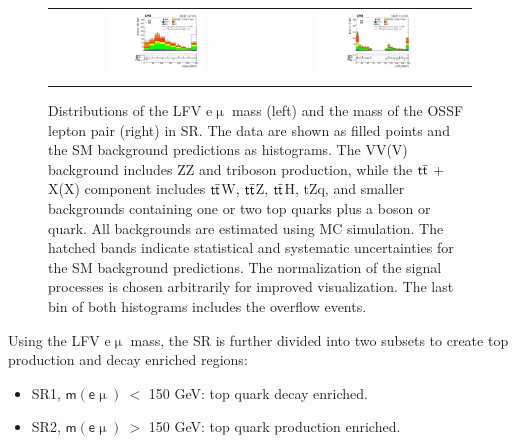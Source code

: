 \begin{figure}[tbh!]
 \begin{center}
 \begin{tabular}{cc}
 \includegraphics[width=0.48\textwidth]{figures/Part3/Selection/Memu}&
 \includegraphics[width=0.48\textwidth]{figures/Part3/Selection/Zmass} \\
 \end{tabular}
 \caption{Distributions of the LFV e$\upmu$ mass (left) and the mass of the \ac{OSSF} lepton pair (right) in \ac{SR}. The data are shown as filled points and the \ac{SM} background predictions as histograms. The VV(V) background includes ZZ and triboson production, while the $\textsf{t}\overline{\textsf{t}}$ + X(X) component includes $\textsf{t}\overline{\textsf{t}}$W, $\textsf{t}\overline{\textsf{t}}$Z, $\textsf{t}\overline{\textsf{t}}$H, tZq, and smaller backgrounds containing one or two top quarks plus a boson or quark. All backgrounds are estimated using \ac{MC} simulation. The hatched bands indicate statistical and systematic uncertainties for the \ac{SM} background predictions. The normalization of the signal processes is chosen arbitrarily for improved visualization. The last bin of both histograms includes the overflow events.}
 \label{fig:SR}
 \end{center}
\end{figure}

Using the LFV e$\upmu$ mass, the \ac{SR} is further divided into two subsets to create top production and decay enriched regions:

\begin{itemize}
\item SR1, $\textsf{m}(\textsf{e}\upmu)~<$ 150 GeV: top quark decay enriched.
\item SR2, $\textsf{m}(\textsf{e}\upmu)~>$ 150 GeV: top quark production enriched.
\end{itemize}
